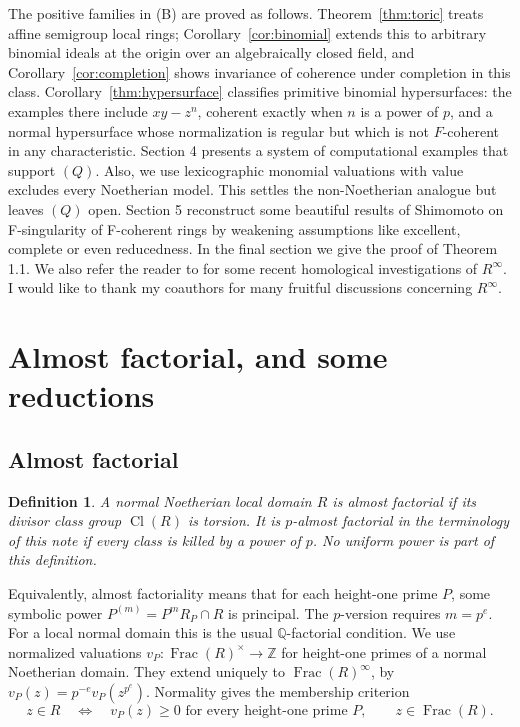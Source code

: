 \documentclass[11pt,a4paper]{amsart}
\numberwithin{equation}{section}
\newtheorem{definition}[theorem]{Definition}
\newcommand{\Cl}{\operatorname{Cl}}
\newcommand{\Frac}{\operatorname{Frac}}
\newcommand{\ZZ}{\mathbb Z}
\begin{document}
The positive families in (B) are proved as follows.
Theorem~\ref{thm:toric} treats affine semigroup local rings;
Corollary~\ref{cor:binomial} extends this to arbitrary binomial ideals
at the origin over an algebraically closed field, and
Corollary~\ref{cor:completion} shows invariance of coherence under
completion in this class. Corollary~\ref{thm:hypersurface} classifies
primitive binomial hypersurfaces: the examples there include
$xy-z^n$, coherent exactly when $n$ is a power of $p$, and a
normal hypersurface whose normalization is regular but which is not
$F$-coherent in any characteristic.  Section 4 presents a system of computational examples that support $(Q)$. Also, we  use  lexicographic monomial valuations with value  excludes every Noetherian model. This
settles the non-Noetherian analogue but leaves $(Q)$ open.
Section 5 reconstruct some beautiful results of Shimomoto \cite{Shim} on F-singularity of F-coherent rings by  weakening assumptions like excellent, complete or even reducedness. In the final section we give the proof of Theorem 1.1. We also refer the reader to \cite{Ryo,Asg26,MPa,Elham} for some recent homological investigations of \(R^\infty\). I would like to thank my coauthors for many fruitful discussions concerning \(R^\infty\).

	\section{Almost factorial, and some reductions}
 	\subsection{Almost factorial}
 \begin{definition}
 	A normal Noetherian local domain $R$ is \emph{almost factorial}
 	if its divisor class group $\Cl(R)$ is torsion.
 	It is \emph{$p$-almost factorial} in the terminology of this note
 	if every class is killed by a power of $p$.
 	No uniform power is part of this definition.
 \end{definition}
 
 Equivalently, almost factoriality means that for each height-one
 prime $P$, some symbolic power
$ P^{(m)}=P^mR_P\cap R
$ is principal. The $p$-version requires $m=p^e$.
 For a local normal domain this is the usual $\mathbb Q$-factorial
 condition.
 We use normalized valuations $v_P:\Frac(R)^\times\to\ZZ$ for
 height-one primes of a normal Noetherian domain. They extend uniquely
 to $\Frac(R)^\infty$, by
$
 v_P(z)=p^{-e}v_P(z^{p^e}).
$ Normality gives the membership criterion
 $$
 z\in R\quad\Longleftrightarrow\quad
 v_P(z)\geq0\text{ for every height-one prime }P,
 \qquad z\in\Frac(R).
 $$
 
\end{document}
